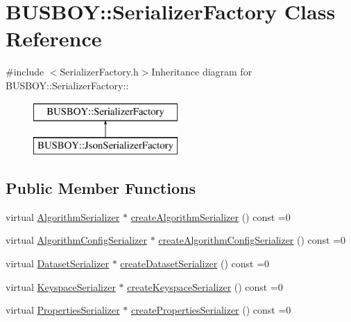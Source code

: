 \hypertarget{classBUSBOY_1_1SerializerFactory}{
\section{BUSBOY::SerializerFactory Class Reference}
\label{classBUSBOY_1_1SerializerFactory}
}


{\ttfamily \#include $<$SerializerFactory.h$>$}Inheritance diagram for BUSBOY::SerializerFactory::\begin{figure}[H]
\begin{center}
\leavevmode
\includegraphics[height=2cm]{classBUSBOY_1_1SerializerFactory}
\end{center}
\end{figure}
\subsection*{Public Member Functions}
\begin{DoxyCompactItemize}
\item 
virtual \hyperlink{classBUSBOY_1_1AlgorithmSerializer}{AlgorithmSerializer} $\ast$ \hyperlink{classBUSBOY_1_1SerializerFactory_abe18c71b6f595c80c435c5682a0e950f}{createAlgorithmSerializer} () const =0
\item 
virtual \hyperlink{classBUSBOY_1_1AlgorithmConfigSerializer}{AlgorithmConfigSerializer} $\ast$ \hyperlink{classBUSBOY_1_1SerializerFactory_a3df659bd0484f2dc289b936df8dfa5a8}{createAlgorithmConfigSerializer} () const =0
\item 
virtual \hyperlink{classBUSBOY_1_1DatasetSerializer}{DatasetSerializer} $\ast$ \hyperlink{classBUSBOY_1_1SerializerFactory_ae8e6bceb0e8e3a3b7f72dca8930376fb}{createDatasetSerializer} () const =0
\item 
virtual \hyperlink{classBUSBOY_1_1KeyspaceSerializer}{KeyspaceSerializer} $\ast$ \hyperlink{classBUSBOY_1_1SerializerFactory_a76f6c404097a5412b5831eb38066e1e2}{createKeyspaceSerializer} () const =0
\item 
virtual \hyperlink{classBUSBOY_1_1PropertiesSerializer}{PropertiesSerializer} $\ast$ \hyperlink{classBUSBOY_1_1SerializerFactory_a3e5cee585280539a83558d4553a8d77a}{createPropertiesSerializer} () const =0
\end{DoxyCompactItemize}


